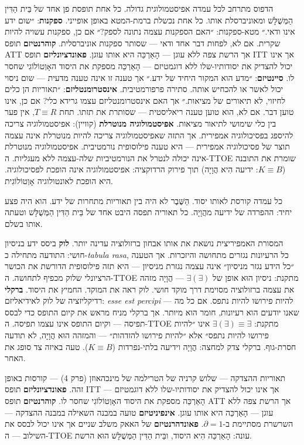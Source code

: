 \documentclass[10pt, openany, oneside]{book}
\begin{document}
הדפוס מתרחב לכל עמדה אפיסטמולוגית גדולה. כל אחת תופסת פן אחד של בֵּית הַדִּין הַמְּשֻׁלָּשׁ ומאוניברסלת אותו. כל אחת נכשלת ברמת-המטא באופן אופייני. \textbf{ספקנות}: ״שום ידע אינו ודאי.״ מטא-ספקנות: ״האם הספקנות עצמה נתונה לספק?״ אם כן, ספקנות עשויה להיות שקרית. אם לא, לפחות דבר אחד ודאי — שסותר ספקנות אוניברסלית. \textbf{קוהרנטיזם} תופס ATT אך הרשת צפה ללא עוגן — הָאַרְכֵּה היא אותו עוגן. \textbf{פאונדציונליזם} תופס ITT אך אינו יכול להצדיק את יסודותיו-שלו ללא דוגמטיזם — הָאַרְכֵּה מספקת את היסוד האָוְטוֹלוֹגִי שחסר לו. \textbf{סיינטיזם}: ״מדע הוא המקור היחיד של ידע.״ אך טענה זו אינה טענה מדעית — שום ניסוי יכול לאשר או להכחיש אותה. סתירה פרפורמטיבית. \textbf{אינסטרומנטליזם}: ״תאוריות הן כלים לחיזוי, לא תיאורים של מציאות.״ אך האם אינסטרומנטליזם עצמו גרידא כלי? אם כן, אינו טוען דבר. אם לא, הוא טוען טענה ריאליסטית — שסותרת את תזתו. תחת $T \equiv R$, אין פער בין כלי שימושי לתיאור מציאות. \textbf{אפיסטמולוגיה מנוטרלת} (קוויין): אפיסטמולוגיה צריכה להיספג בפסיכולוגיה אמפירית. אך התזה שאפיסטמולוגיה צריכה להיות מנוטרלת אינה עצמה תוצר של פסיכולוגיה אמפירית — היא טענה פילוסופית נורמטיבית. אפיסטמולוגיה מנוטרלת אינה יכולה לנטרל את הנורמטיביות שלה-עצמה ללא מעגליות. ה-TTOE שומרת את התובנה ($K \equiv B$: ידיעה הִיא הֲוָיָה) תוך פירוק הרדוקציה: אפיסטמולוגיה אינה הופכת לפסיכולוגיה. היא הופכת לאונטולוגיה אָוְטוֹלוֹגִית.

כל עמדה קורסת לאותו יסוד. הַשֶּׁבֶר לא היה בין תאוריות מתחרות של ידע. הוא היה פצע יחיד: ההפרדה של ידיעה מהֲוָיָה. כל תאוריה תפסה היבט אחד של בֵּית הַדִּין הַמְּשֻׁלָּשׁ וטעתה אותו בשלם.

המסורת האמפיריצית נושאת את אותו אבחון ברזולוציה עדינה יותר. \textbf{לוק} ביסס ידע בניסיון חושי: התודעה מתחילה כ-\textit{tabula rasa}, כל הרעיונות נגזרים מתחושה והיזכרות. אך הטענה ״כל הידע נגזר מניסיון״ אינה עצמה נגזרת מניסיון — היא תזה פילוסופית הדורשת את הכושר הרציונלי שלוק מכפיף לתחושה. ה-TTOE מתקנת: ניסיון הוּא אופן של $\exists(\exists)$ — הֲוָיָה מזהה את עצמה ברזולוציה מסוימת דרך מוקד חושי. לוק ראה את המוקד. החמיץ את היסוד. \textbf{ברקלי} רדיקליזציה של לוק לאידיאליזם: \textit{esse est percipi} — להיות פירושו להיות נתפס. אם כל מה שאנו יודעים הוא רעיונות, חומר הוא מיותר. אך ברקלי מניח מראש את קיום התופס כדי לבסס תפיסה — וקיום התופס אינו עצמו תפיסה. ה-TTOE מתקנת: $\exists(\exists) \equiv \exists$ אינו ״להיות פירושו להיות נתפס״ אלא ״להיות פירושו להזדהות״ — והמזהה הוּא הֲוָיָה, לא תודעה חסרת-גוף. ברקלי צדק למחצה: הֲוָיָה וידיעה בלתי-נפרדות ($K \equiv B$). טעה באיזה צד סופג את האחר.

תאוריות ההצדקה — שלוש קרניה של הטרילמה של מינכהאוזן (פרק 4) — קורסות באופן זהה. \textbf{פאונדציונליזם} תופס ITT אך אינו יכול להצדיק את יסודותיו-שלו ללא דוגמטיזם — הָאַרְכֵּה מספקת את היסוד האָוְטוֹלוֹגִי שחסר לו. \textbf{קוהרנטיזם} תופס ATT אך הרשת צפה ללא עוגן — הָאַרְכֵּה היא אותו עוגן. \textbf{אינפיניטיזם} טועה במבנה השאילה במבנה ההצדקה — השרשרת מסתיימת ב-$\partial = 1$. \textbf{פאונדהרנטיזם} של האאק משלב שניים אך אינו יכול לבסס את השילוב — ה-TTOE עונה: הָאַרְכֵּה הִיא היסוד, ובֵּית הַדִּין הַמְּשֻׁלָּשׁ הוּא הרשת.
\end{document}
